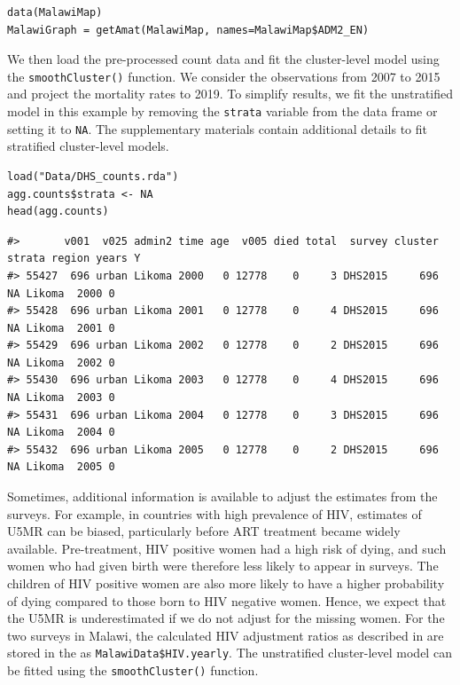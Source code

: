 \begin{verbatim}
data(MalawiMap)
MalawiGraph = getAmat(MalawiMap, names=MalawiMap$ADM2_EN)
\end{verbatim}

We then load the pre-processed count data and fit the cluster-level model using the \texttt{smoothCluster()} function. We consider the observations from 2007 to 2015 and project the mortality rates to 2019. To simplify results, we fit the unstratified model in this example by removing the \texttt{strata} variable from the data frame or setting it to \texttt{NA}. The supplementary materials contain additional details to fit stratified cluster-level models.

\begin{verbatim}
load("Data/DHS_counts.rda")
agg.counts$strata <- NA
head(agg.counts)
\end{verbatim}

\begin{verbatim}
#>       v001  v025 admin2 time age  v005 died total  survey cluster strata region years Y
#> 55427  696 urban Likoma 2000   0 12778    0     3 DHS2015     696     NA Likoma  2000 0
#> 55428  696 urban Likoma 2001   0 12778    0     4 DHS2015     696     NA Likoma  2001 0
#> 55429  696 urban Likoma 2002   0 12778    0     2 DHS2015     696     NA Likoma  2002 0
#> 55430  696 urban Likoma 2003   0 12778    0     4 DHS2015     696     NA Likoma  2003 0
#> 55431  696 urban Likoma 2004   0 12778    0     3 DHS2015     696     NA Likoma  2004 0
#> 55432  696 urban Likoma 2005   0 12778    0     2 DHS2015     696     NA Likoma  2005 0
\end{verbatim}

Sometimes, additional information is available to adjust the estimates from the surveys. For example, in countries with high prevalence of HIV, estimates of U5MR can be biased, particularly before ART treatment became widely available. Pre-treatment, HIV positive women had a high risk of dying, and such women who had given birth were therefore less likely to appear in surveys. The children of HIV positive women are also more likely to have a higher probability of dying compared to those born to HIV negative women. Hence, we expect that the U5MR is underestimated if we do not adjust for the missing women. For the two surveys in Malawi, the calculated HIV adjustment ratios as described in \citet{walker_etal_12} are stored in the  as \texttt{MalawiData\$HIV.yearly}. The unstratified cluster-level model can be fitted using the \texttt{smoothCluster()} function.

